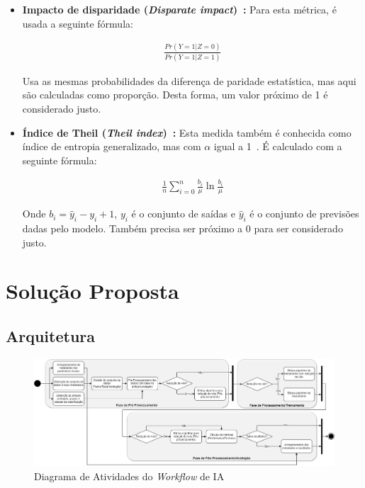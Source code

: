 \documentclass[twocolumn]{article}
\begin{document}
\begin{itemize}
\item \textbf{Impacto de disparidade (\textit{Disparate impact})~\citep{Biswas_2020}:} Para esta métrica, é usada a seguinte fórmula:

\begin{align*}
\frac{Pr(Y=1|Z=0)}{Pr(Y=1|Z=1)}
\end{align*}

Usa as mesmas probabilidades da diferença de paridade estatística, mas aqui são calculadas como proporção. Desta forma, um valor próximo de 1 é considerado justo.

\item \textbf{Índice de Theil (\textit{Theil index})~\citep{Speicher_2018}:} Esta medida também é conhecida como índice de entropia generalizado, mas com $\alpha$ igual a 1~\citep{Speicher_2018}. É calculado com a seguinte fórmula:

\begin{align*}
\frac{1}{n}\sum^{n}_{i=0}\frac{b_i}{\mu}\ln{\frac{b_i}{\mu}}
\end{align*}

Onde $b_i = \hat{y}_i - y_i + 1$, $y_i$ é o conjunto de saídas e $\hat{y}_i$ é o conjunto de previsões dadas pelo modelo. Também precisa ser próximo a 0 para ser considerado justo.

\end{itemize}

\section{Solução Proposta}

\subsection{Arquitetura}

\begin{figure}[h]
\centering
\includegraphics[scale=0.3]{images/ml-fairness-pipeline.jpg}
\caption {Diagrama de Atividades do \textit{Workflow} de IA}
\label{fig:BackendFrontendML}
\end{figure}
\end{document}
